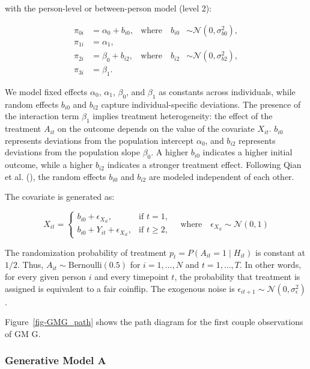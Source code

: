 \documentclass[
  11pt,
  a4paper,
]{article}
\begin{document}
with the person-level or between-person model (level 2):

\[
\begin{aligned}
\pi_{0i} &= \alpha_0 + b_{i0}, & \text{where} \quad b_{i0} &\sim \mathcal{N}(0, \sigma_{b0}^2), \\
\pi_{1i} &= \alpha_1, \\
\pi_{2i} &= \beta_0 + b_{i2}, & \text{where} \quad b_{i2} &\sim \mathcal{N}(0, \sigma_{b2}^2), \\
\pi_{3i} &= \beta_1.
\end{aligned}
\]

We model fixed effects \(\alpha_0\), \(\alpha_1\), \(\beta_0\), and
\(\beta_1\) as constants across individuals, while random effects
\(b_{i0}\) and \(b_{i2}\) capture individual-specific deviations. The
presence of the interaction term \(\beta_1\) implies treatment
heterogeneity: the effect of the treatment \(A_{it}\) on the outcome
depends on the value of the covariate \(X_{it}\). \(b_{i0}\) represents
deviations from the population intercept \(\alpha_0\), and \(b_{i2}\)
represents deviations from the population slope \(\beta_0\). A higher
\(b_{i0}\) indicates a higher initial outcome, while a higher \(b_{i2}\)
indicates a stronger treatment effect. Following Qian et al.
(), the random effects \(b_{i0}\) and
\(b_{i2}\) are modeled independent of each other.

The covariate is generated as:

\[
X_{it} = 
\begin{cases} 
b_{i0} + \epsilon_{X_{it}}, & \text{if } t = 1, \\
b_{i0} + Y_{it} + \epsilon_{X_{it}}, & \text{if } t \geq 2,
\end{cases}
\quad \text{where} \quad \epsilon_{X_{it}} \sim \mathcal{N}(0, 1)
\]

The randomization probability of treatment
\(p_t = P(A_{it} = 1 \mid H_{it})\) is constant at \(1/2\). Thus,
\(A_{it} \sim \text{Bernoulli}(0.5)\) for \(i = 1, \ldots, N\) and
\(t = 1, \ldots, T\). In other words, for every given person \(i\) and
every timepoint \(t\), the probability that treatment is assigned is
equivalent to a fair coinflip. The exogenous noise is
\(\epsilon_{it+1} \sim \mathcal{N}(0, \sigma_\epsilon^2)\).

Figure~\ref{fig-GMG_path} shows the path diagram for the first couple
observations of GM G.

\subsubsection{Generative Model A}\label{generative-model-a}
\end{document}
